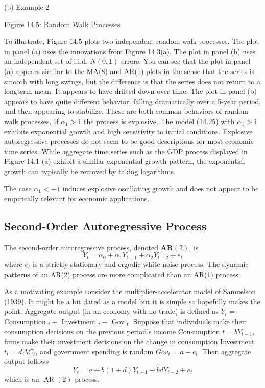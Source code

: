 \documentclass[10pt]{article}
\begin{document}
(b) Example 2

Figure 14.5: Random Walk Processes

To illustrate, Figure $14.5$ plots two independent random walk processes. The plot in panel (a) uses the innovations from Figure 14.3(a). The plot in panel (b) uses an independent set of i.i.d. $N(0,1)$ errors. You can see that the plot in panel (a) appears similar to the MA(8) and AR(1) plots in the sense that the series is smooth with long swings, but the difference is that the series does not return to a longterm mean. It appears to have drifted down over time. The plot in panel (b) appears to have quite different behavior, falling dramatically over a 5-year period, and then appearing to stabilize. These are both common behaviors of random walk processes. If $\alpha_{1}>1$ the process is explosive. The model (14.25) with $\alpha_{1}>1$ exhibits exponential growth and high sensitivity to initial conditions. Explosive autoregressive processes do not seem to be good descriptions for most economic time series. While aggregate time series such as the GDP process displayed in Figure 14.1 (a) exhibit a similar exponential growth pattern, the exponential growth can typically be removed by taking logarithms.

The case $\alpha_{1}<-1$ induces explosive oscillating growth and does not appear to be empirically relevant for economic applications.

\subsection{Second-Order Autoregressive Process}
The second-order autoregressive process, denoted $\mathbf{A R}(2)$, is
$$
Y_{t}=\alpha_{0}+\alpha_{1} Y_{t-1}+\alpha_{2} Y_{t-2}+e_{t}
$$
where $e_{t}$ is a strictly stationary and ergodic white noise process. The dynamic patterns of an AR(2) process are more complicated than an AR(1) process.

As a motivating example consider the multiplier-accelerator model of Samuelson (1939). It might be a bit dated as a model but it is simple so hopefully makes the point. Aggregate output (in an economy with no trade) is defined as $Y_{t}=$ Consumption $_{t}+$ Investment $_{t}+$ Gov $_{t}$. Suppose that individuals make their consumption decisions on the previous period's income Consumption $t=b Y_{t-1}$, firms make their investment decisions on the change in consumption Investment $t_{t}=d \Delta C_{t}$, and government spending is random $G o v_{t}=a+e_{t}$. Then aggregate output follows
$$
Y_{t}=a+b(1+d) Y_{t-1}-b d Y_{t-2}+e_{t}
$$
which is an $\operatorname{AR}(2)$ process.
\end{document}
